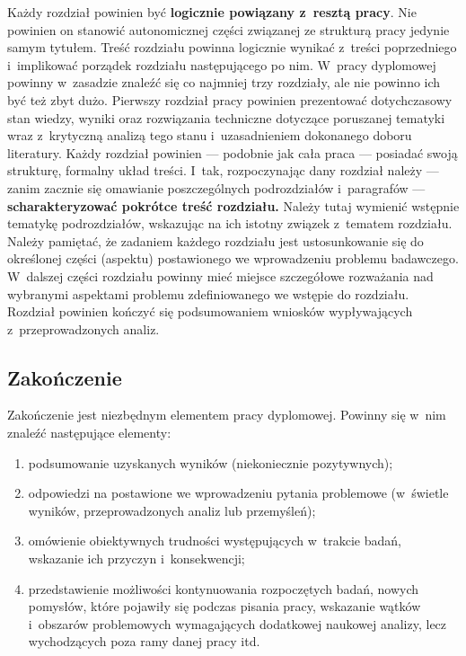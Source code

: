 \documentclass[skorowidz,skroty]{dyplomWEZUT}
\begin{document}
Każdy rozdział powinien być \textbf{logicznie powiązany z~resztą pracy}. Nie powinien on stanowić autonomicznej części związanej ze strukturą pracy jedynie samym tytułem. Treść rozdziału powinna logicznie wynikać z~treści poprzedniego i~implikować porządek rozdziału następującego po nim.  W~pracy dyplomowej powinny w~zasadzie znaleźć się co najmniej trzy rozdziały, ale nie powinno ich być też zbyt dużo. Pierwszy rozdział pracy powinien prezentować dotychczasowy stan wiedzy, wyniki oraz rozwiązania techniczne dotyczące poruszanej tematyki wraz z~krytyczną analizą tego stanu i~uzasadnieniem dokonanego doboru literatury. Każdy rozdział powinien --- podobnie jak cała praca --- posiadać swoją strukturę, formalny układ treści. I~tak, rozpoczynając dany rozdział należy --- zanim zacznie się omawianie poszczególnych podrozdziałów i~paragrafów --- \textbf{scharakteryzować pokrótce treść rozdziału.} Należy tutaj wymienić wstępnie tematykę podrozdziałów, wskazując na ich istotny związek z~tematem rozdziału. Należy pamiętać, że zadaniem każdego rozdziału jest ustosunkowanie się do określonej części (aspektu) postawionego we wprowadzeniu problemu badawczego. W~dalszej części rozdziału powinny mieć miejsce szczegółowe rozważania nad wybranymi aspektami problemu zdefiniowanego we wstępie do rozdziału. Rozdział powinien kończyć się podsumowaniem wniosków wypływających z~przeprowadzonych analiz.

\subsection{Zakończenie}\label{sec:zakonczenie}

Zakończenie jest niezbędnym elementem pracy dyplomowej. Powinny się w~nim znaleźć następujące elementy:

\begin{enumerate}
\item podsumowanie uzyskanych wyników (niekoniecznie pozytywnych);
\item odpowiedzi na postawione we wprowadzeniu pytania problemowe (w~świetle wyników, przeprowadzonych analiz lub przemyśleń);
\item omówienie obiektywnych trudności występujących w~trakcie badań, wskazanie ich przyczyn i~konsekwencji;
\item przedstawienie możliwości kontynuowania rozpoczętych badań, nowych pomysłów, które pojawiły się podczas pisania pracy, wskazanie wątków i~obszarów problemowych wymagających dodatkowej naukowej analizy, lecz wychodzących poza ramy danej pracy itd.
\end{enumerate}
\end{document}
